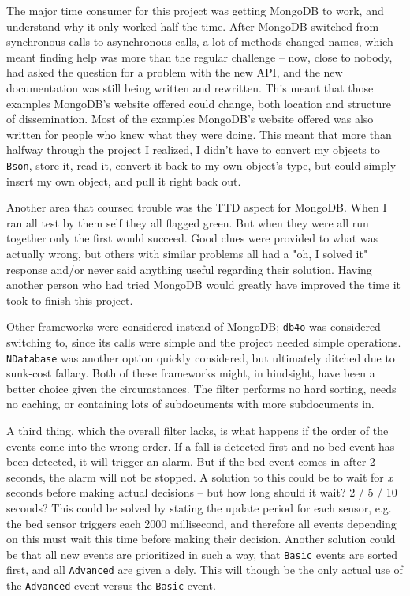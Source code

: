 The major time consumer for this project was getting MongoDB to work, and understand why it only worked half the time.
After MongoDB switched from synchronous calls to asynchronous calls, a lot of methods changed names, which meant finding help was more than the regular challenge -- now, close to nobody, had asked the question for a problem with the new API, and the new documentation was still being written and rewritten.
This meant that those examples MongoDB's website offered could change, both location and structure of dissemination.
Most of the examples MongoDB's website offered was also written for people who knew what they were doing. 
This meant that more than halfway through the project I realized, I didn't have to convert my objects to \texttt{Bson}, store it, read it, convert it back to my own object's type, but could simply insert my own object, and pull it right back out.

Another area that coursed trouble was the TTD aspect for MongoDB. 
When I ran all test by them self they all flagged green.
But when they were all run together only the first would succeed. 
Good clues were provided to what was actually wrong, but others with similar problems all had a "oh, I solved it" response and/or never said anything useful regarding their solution.
Having another person who had tried MongoDB would greatly have improved the time it took to finish this project.

Other frameworks were considered instead of MongoDB; \texttt{db4o}\cite{db4o} was considered switching to, since its calls were simple and the project needed simple operations.
\texttt{NDatabase} was another option quickly considered, but ultimately ditched due to sunk-cost fallacy.
Both of these frameworks might, in hindsight, have been a better choice given the circumstances.
The filter performs no hard sorting, needs no caching, or containing lots of subdocuments with more subdocuments in.


A third thing, which the overall filter lacks, is what happens if the order of the events come into the wrong order.
If a fall is detected first and no bed event has been detected, it will trigger an alarm.
But if the bed event comes in after 2 seconds, the alarm will not be stopped.
A solution to this could be to wait for  \textit{x} seconds before making actual decisions -- but how long should it wait? 
2 / 5 / 10 seconds?
This could be solved by stating the update period for each sensor, e.g. the bed sensor triggers each 2000 millisecond, and therefore all events depending on this must wait this time before making their decision.
Another solution could be that all new events are prioritized in such a way, that \texttt{Basic} events are sorted first, and all \texttt{Advanced} are given a dely.
This will though be the only actual use of the \texttt{Advanced} event versus the \texttt{Basic} event.

